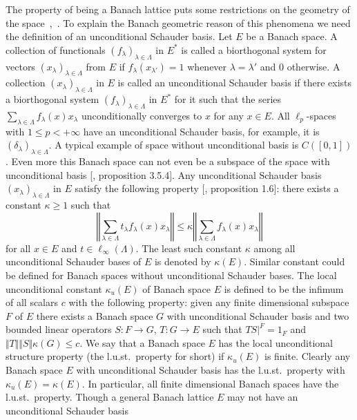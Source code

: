The property of being a Banach lattice puts some restrictions on the geometry of
the space~\cite{SherOrderInOpAlg},~\cite{KadOrderPropOfBoundSAOps}. To explain
the Banach geometric reason of this phenomena we need the definition of an
unconditional Schauder basis. Let $E$ be a Banach space. A collection of
functionals ${(f_\lambda)}_{\lambda\in\Lambda}$ in $E^*$ is called 
a biorthogonal system for vectors ${(x_\lambda)}_{\lambda\in\Lambda}$ 
from $E$ if $f_\lambda(x_{\lambda'})=1$ whenever $\lambda=\lambda'$ 
and $0$ otherwise. A collection ${(x_\lambda)}_{\lambda\in\Lambda}$ 
in $E$ is called an unconditional Schauder basis if there exists 
a biorthogonal system ${(f_\lambda)}_{\lambda\in\Lambda}$ in $E^*$ 
for it such that the series
$\sum_{\lambda\in\Lambda} f_\lambda(x)x_\lambda$ unconditionally converges to
$x$ for any $x\in E$. All $\ell_p$-spaces with $1\leq p<+\infty$ have an
unconditional Schauder basis, for example, it is
${(\delta_\lambda)}_{\lambda\in\Lambda}$. A typical example of space without
unconditional basis is $C([0,1])$. Even more this Banach space can not even be a
subspace of the space with unconditional basis [\cite{KalAlbTopicsBanSpTh},
proposition 3.5.4].  Any unconditional Schauder basis
${(x_\lambda)}_{\lambda\in\Lambda}$ in $E$ satisfy the following property
[\cite{DiestAbsSumOps}, proposition 1.6]: there exists a constant $\kappa\geq 1$
such that
$$
\left\Vert \sum_{\lambda\in\Lambda}t_\lambda f_\lambda(x)x_\lambda\right\Vert
\leq
\kappa\left\Vert \sum_{\lambda\in\Lambda}f_\lambda(x)x_\lambda\right\Vert
$$
for all $x\in E$ and $t\in\ell_\infty(\Lambda)$. The least such constant
$\kappa$ among all unconditional Schauder bases of $E$ is denoted by
$\kappa(E)$. Similar constant could be defined for Banach spaces without
unconditional Schauder bases. The local unconditional constant $\kappa_u(E)$ of
Banach space $E$ is defined to be the infimum of all scalars $c$ with the
following property: given any finite dimensional subspace $F$ of $E$ there
exists a Banach space $G$ with unconditional Schauder basis and two bounded
linear operators $S:F\to G$, $T:G\to E$ such that $TS|^{F}=1_F$ and $\Vert
T\Vert\Vert S\Vert\kappa(G)\leq c$. We say that a Banach space $E$ has the local
unconditional structure property (the l.u.st.\ property for short) if
$\kappa_u(E)$ is finite. Clearly any Banach space $E$ with unconditional
Schauder basis has the l.u.st.\ property with $\kappa_u(E)=\kappa(E)$. In
particular, all finite dimensional Banach spaces have the l.u.st.\ property.
Though a general Banach lattice $E$ may not have an unconditional Schauder basis
